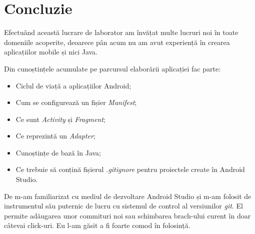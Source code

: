 \section*{Concluzie}

\par Efectuând această lucrare de laborator am învățat multe lucruri noi în toate domeniile acoperite, deoarece pân acum nu am avut experiență în crearea aplicațiilor mobile și nici Java. 
\par Din cunoștințele acumulate pe parcursul elaborării aplicației fac parte:
\begin{itemize}
 \item Ciclul de viață a aplicațiilor Android;
 \item Cum se configurează un fișier \textit{Manifest};
 \item Ce sunt \textit{Activity} și \textit{Fragment};
 \item Ce reprezintă un \textit{Adapter};
 \item Cunoștințe de bază în Java;
 \item Ce trebuie să conțină fișierul \textit{.gitignore} pentru proiectele create în Android Studio.
\end{itemize}
\par De m-am familiarizat cu mediul de dezvoltare Android Studio și m-am folosit de instrumentul său puternic de lucru cu sistemul de control al versiunilor \textit{git}. El permite adăugarea unor commituri noi sau schimbarea brach-ului curent în doar câtevai click-uri. Eu l-am găsit a fi foarte comod în folosință.

\clearpage